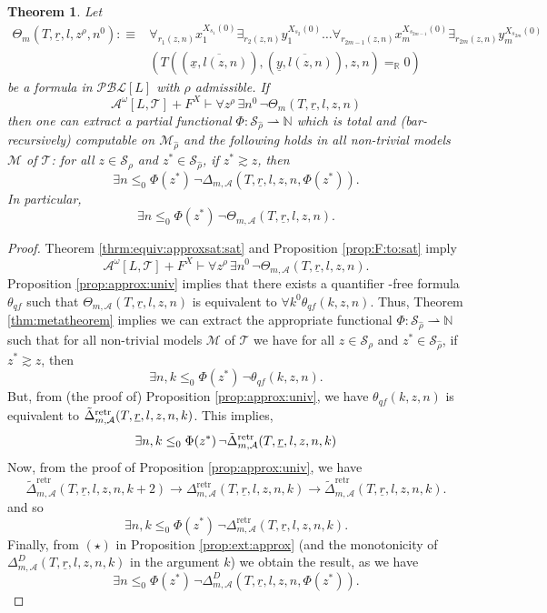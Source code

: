 \documentclass[11pt]{amsart}
\newtheorem{theorem}{Theorem}[section]
\theoremstyle{definition}
\theoremstyle{remark}
\def\RR{\mathbb{R}}
\begin{document}
\begin{theorem}\label{thm:metatheorem2}
 Let
 \begin{align*}
       \Theta_m(T,\underline{r},l,z^\rho,n^0):\equiv&\forall_{r_1(z,n)} x_1^{X_{s_1}(0)} \exists_{r_2(z,n)} y_1^{X_{s_2}(0)} \ldots \forall_{r_{2m-1}(z,n)} x_m^{X_{s_{2m-1}}(0)}\exists_{r_{2m}(z,n)} y_m^{X_{s_{2m}}(0)}\,\\&(T((\overline{\underline{x},l(z,n)}),(\overline{\underline{y},l(z,n)}),z,n)=_\RR 0)
 \end{align*}
be a formula in $\mathcal{PBL}[L]$ with $\rho$ admissible. If
\[
\mathcal{A}^\omega[L,\mathcal{T}]+F^X\vdash \forall z^\rho\, \exists n^0\,\neg\Theta_{m}(T,\underline{r},l,z,n)
\]
then one can extract a partial functional $\Phi:\mathcal{S}_{\widehat{\rho}}\rightharpoonup\mathbb{N}$ which is total and (bar-recursively) computable on $\mathcal{M}_{\widehat{\rho}}$ and the following holds in all non-trivial models $\mathscr{M}$ of $\mathcal{T}$: for all $z\in \mathcal{S}_\rho$ and $z^*\in \mathcal{S}_{\widehat{\rho}}$, if $z^*\gtrsim z$, then
\[
 \exists n\leq_0\Phi(z^*)\,\neg\Delta_{m,\mathcal{A}}(T,\underline{r},l,z,n,\Phi(z^*)).
\]
In particular,
\[
 \exists n\leq_0\Phi(z^*)\,\neg\Theta_{m,\mathcal{A}}(T,\underline{r},l,z,n).
\]
\end{theorem}
\begin{proof}
Theorem \ref{thrm:equiv:approxsat:sat} and Proposition \ref{prop:F:to:sat} imply
\[
\mathcal{A}^\omega[L,\mathcal{T}]+F^X\vdash \forall z^\rho\, \exists n^0\, \neg\Theta_{m,\mathcal{A}}(T,\underline{r},l,z,n).
\]
    Proposition \ref{prop:approx:univ} implies that there exists a quantifier -free formula $\theta_{qf}$ such that $\Theta_{m,\mathcal{A}}(T,\underline{r},l,z,n)$ is equivalent to $\forall k^0\theta_{qf}(k,z,n)$. Thus, Theorem \ref{thm:metatheorem} implies we can extract the appropriate functional $\Phi:\mathcal{S}_{\widehat{\rho}}\rightharpoonup\mathbb{N}$ such that for all non-trivial models $\mathscr{M}$ of $\mathcal{T}$ we have for all $z\in \mathcal{S}_\rho$ and $z^*\in \mathcal{S}_{\widehat{\rho}}$, if $z^*\gtrsim z$, then
\[
 \exists n,k \leq_0\Phi(z^*)\,\neg\theta_{qf}(k,z,n).
\]
But, from (the proof of) Proposition \ref{prop:approx:univ}, we have $\theta_{qf}(k,z,n)$ is equivalent to $\Tilde{\Delta}^\mathrm{retr}_{m,\mathcal{A}}(T,\underline{r},l,z,n,k)$. This implies,
\[
 \exists n,k \leq_0\Phi(z^*)\,\neg\Tilde{\Delta}^\mathrm{retr}_{m,\mathcal{A}}(T,\underline{r},l,z,n,k)
\]
Now, from the proof of Proposition \ref{prop:approx:univ}, we have
\[
\tilde{\Delta}^\mathrm{retr}_{m,\mathcal{A}}(T,\underline{r},l,z,n,k+2) \to \Delta^\mathrm{retr}_{m,\mathcal{A}}(T,\underline{r},l,z,n,k) \to \tilde{\Delta}^\mathrm{retr}_{m,\mathcal{A}}(T,\underline{r},l,z,n,k).
\]
and so
\[
 \exists n,k \leq_0\Phi(z^*)\,\neg\Delta^\mathrm{retr}_{m,\mathcal{A}}(T,\underline{r},l,z,n,k).
\]
Finally, from $(\star)$ in  Proposition \ref{prop:ext:approx} (and the monotonicity of $\Delta^D_{m,\mathcal{A}}(T,\underline{r},l,z,n,k)$ in the argument $k$) we obtain the result, as we have 
\[
 \exists n \leq_0\Phi(z^*)\,\neg\Delta^D_{m,\mathcal{A}}(T,\underline{r},l,z,n,\Phi(z^*)).
\]

\end{proof}
\end{document}
